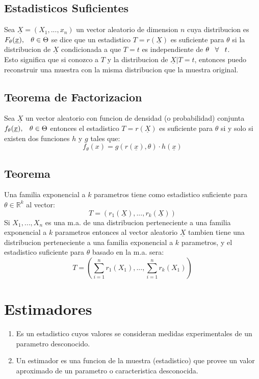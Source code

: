 \documentclass[titlepage,a4paper]{article}
\begin{document}
\subsection{Estadisticos Suficientes}
Sea $\underline{X} = (X_{1},...,x_{n})$ un vector aleatorio de dimension $n$ cuya distribucion es $F_{\theta}(\underline{x}), \hspace{8px} \theta \in \Theta$ se dice que un 
estadistico $T = r(\underline{X})$ es suficiente para $\theta$ si la distribucion de $\underline{X}$ condicionada a que $T=t$ es independiente de $\theta \hspace{8px} \forall \hspace{8px} t$.\\
Esto significa que si conozco a $T$ y la distribucion de $\underline{X}|T=t$, entonces puedo reconstruir una muestra con la misma distribucion que la muestra original.
\subsection{Teorema de Factorizacion}
Sea $\underline{X}$ un vector aleatorio con funcion de densidad (o probabilidad) conjunta $f_{\theta}(\underline{x}), \hspace{8px} \theta \in \Theta$ entonces el estadistico 
$T = r(\underline{X})$ es suficiente para $\theta$ si y solo si existen dos funciones $h$ y $g$ tales que:
\begin{equation*}
    f_{\theta}(x) = g(r(\underline{x}),\theta) \cdot h(\underline{x})
\end{equation*}
\subsection{Teorema}
Una familia exponencial a $k$ parametros tiene como estadistico suficiente para $\theta \in \mathbb{R}^{k}$ al vector:
\begin{equation*}
    T = (r_{1}(\underline{X}),...,r_{k}(\underline{X}))
\end{equation*}
Si $X_{1},...,X_{n}$ es una m.a. de una distribucion perteneciente a una familia exponencial a $k$ parametros entonces al vector aleatorio $\underline{X}$ tambien tiene una distribucion perteneciente a una familia exponencial a $k$ parametros, y el estadistico suficiente para $\theta$ basado en la m.a. sera:
\begin{equation*}
    T = (\sum_{i=1}^{n}r_{1}(X_{1}),...,\sum_{i=1}^{n}r_{k}(X_{1}))
\end{equation*} 
\section{Estimadores}
\begin{enumerate}
    \item Es un estadistico cuyos valores se consideran medidas experimentales de un parametro desconocido.
    \item Un estimador es una funcion de la muestra (estadistico) que provee un valor aproximado de un parametro o caracteristica desconocida.
\end{enumerate} 
\end{document}
